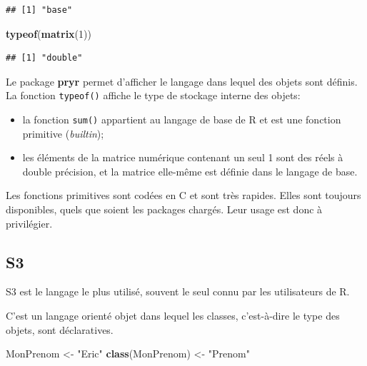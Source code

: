 \documentclass[
  12pt,
  french,
  a4paper,
  extrafontsizes,onecolumn,openright
  ]{memoir}
\newenvironment{Shaded}{\begin{snugshade}}{\end{snugshade}}
\newcommand{\DecValTok}[1]{\textcolor[rgb]{0.00,0.00,0.81}{#1}}
\newcommand{\FunctionTok}[1]{\textcolor[rgb]{0.13,0.29,0.53}{\textbf{#1}}}
\newcommand{\NormalTok}[1]{#1}
\newcommand{\OtherTok}[1]{\textcolor[rgb]{0.56,0.35,0.01}{#1}}
\newcommand{\StringTok}[1]{\textcolor[rgb]{0.31,0.60,0.02}{#1}}
\providecommand{\tightlist}{%
  \setlength{\itemsep}{0pt}\setlength{\parskip}{0pt}}
\begin{document}
\begin{verbatim}
## [1] "base"
\end{verbatim}

\begin{Shaded}
\begin{Highlighting}[]
\FunctionTok{typeof}\NormalTok{(}\FunctionTok{matrix}\NormalTok{(}\DecValTok{1}\NormalTok{))}
\end{Highlighting}
\end{Shaded}

\begin{verbatim}
## [1] "double"
\end{verbatim}

\normalsize

Le package \textbf{pryr} permet d'afficher le langage dans lequel des objets sont définis.
La fonction \texttt{typeof()} affiche le type de stockage interne des objets:

\begin{itemize}
\tightlist
\item
  la fonction \texttt{sum()} appartient au langage de base de R et est une fonction primitive (\emph{builtin});
\item
  les éléments de la matrice numérique contenant un seul 1 sont des réels à double précision, et la matrice elle-même est définie dans le langage de base.
\end{itemize}

Les fonctions primitives sont codées en C et sont très rapides.
Elles sont toujours disponibles, quels que soient les packages chargés.
Leur usage est donc à privilégier.

\subsection{S3}\label{sec:S3}

S3 est le langage le plus utilisé, souvent le seul connu par les utilisateurs de R.

C'est un langage orienté objet dans lequel les classes, c'est-à-dire le type des objets, sont déclaratives.

\scriptsize

\begin{Shaded}
\begin{Highlighting}[]
\NormalTok{MonPrenom }\OtherTok{\textless{}{-}} \StringTok{"Eric"}
\FunctionTok{class}\NormalTok{(MonPrenom) }\OtherTok{\textless{}{-}} \StringTok{"Prenom"}
\end{Highlighting}
\end{Shaded}
\end{document}
